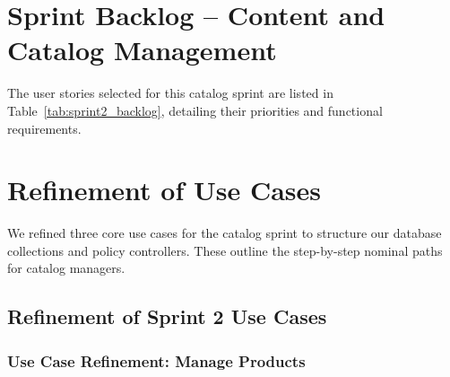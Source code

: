 \documentclass[12pt,a4paper]{report}
\begin{document}
\section{Sprint Backlog -- Content and Catalog Management}

The user stories selected for this catalog sprint are listed in Table~\ref{tab:sprint2_backlog}, detailing their priorities and functional requirements.

\renewcommand{\arraystretch}{1.3}
\setlength{\tabcolsep}{8pt}

\begin{table}[H]
\centering
\caption{User stories for Release 2 (Content and Catalog Management)}
\label{tab:sprint2_backlog}
\end{table}

\section{Refinement of Use Cases}

We refined three core use cases for the catalog sprint to structure our database collections and policy controllers. These outline the step-by-step nominal paths for catalog managers.

\subsection{Refinement of Sprint 2 Use Cases}

\subsubsection{Use Case Refinement: Manage Products}
\end{document}
